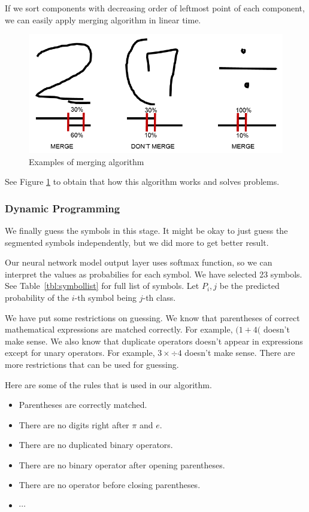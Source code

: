 \documentclass[10pt,twocolumn,letterpaper]{article}
\begin{document}
If we sort components with decreasing order of leftmost point of each component,
we can easily apply merging algorithm in linear time.

\begin{figure}[t]
    \begin{center}
        \includegraphics[width=0.8\linewidth]{img/merging.png}
    \end{center}
    \caption{Examples of merging algorithm}
    \label{fig:merging}
\end{figure}

See Figure \ref{fig:merging} to obtain that how this algorithm works and solves problems.

\subsubsection{Dynamic Programming}

We finally guess the symbols in this stage.
It might be okay to just guess the segmented symbols independently,
but we did more to get better result.

Our neural network model output layer uses softmax function,
so we can interpret the values as probabilies for each symbol.
We have selected 23 symbols. See Table~\ref{tbl:symbollist} for full list of symbols.
Let $P_i,j$ be the predicted probability of the $i$-th symbol being $j$-th class.

We have put some restrictions on guessing.
We know that parentheses of correct mathematical expressions are matched correctly.
For example, $(1 + 4($ doesn't make sense.
We also know that duplicate operators doesn't appear in expressions except for
unary operators. For example, $3 \times \div 4$ doesn't make sense.
There are more restrictions that can be used for guessing.

Here are some of the rules that is used in our algorithm.
\begin{itemize}
\item Parentheses are correctly matched.
\item There are no digits right after $\pi$ and $e$.
\item There are no duplicated binary operators.
\item There are no binary operator after opening parentheses.
\item There are no operator before closing parentheses.
\item $\cdots$
\end{itemize}
\end{document}
